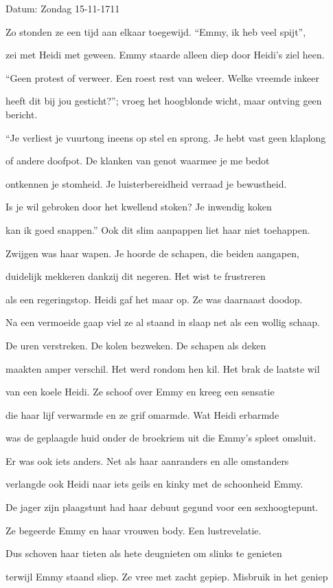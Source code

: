Datum: Zondag 15-11-1711

Zo stonden ze een tijd
aan elkaar toegewijd.
“Emmy, ik heb veel spijt”,

zei met Heidi met geween.
Emmy staarde alleen
diep door Heidi’s ziel heen.

“Geen protest of verweer.
Een roest rest van weleer.
Welke vreemde inkeer

heeft dit bij jou gesticht?”;
vroeg het hoogblonde wicht,
maar ontving geen bericht.

“Je verliest je vuurtong
ineens op stel en sprong.
Je hebt vast geen klaplong

of andere doofpot.
De klanken van genot
waarmee je me bedot

ontkennen je stomheid.
Je luisterbereidheid
verraad je bewustheid.

Is je wil gebroken
door het kwellend stoken?
Je inwendig koken

kan ik goed snappen.”
Ook dit slim aanpappen
liet haar niet toehappen.

Zwijgen was haar wapen.
Je hoorde de schapen,
die beiden aangapen,

duidelijk mekkeren
dankzij dit negeren.
Het wist te frustreren

als een regeringstop.
Heidi gaf het maar op.
Ze was daarnaast doodop.

Na een vermoeide gaap
viel ze al staand in slaap
net als een wollig schaap.

De uren verstreken.
De kolen bezweken.
De schapen als deken

maakten amper verschil.
Het werd rondom hen kil.
Het brak de laatste wil

van een koele Heidi.
Ze schoof over Emmy
en kreeg een sensatie

die haar lijf verwarmde
en ze grif omarmde.
Wat Heidi erbarmde

was de geplaagde huid
onder de broekriem uit
die Emmy’s spleet omsluit.

Er was ook iets anders.
Net als haar aanranders
en alle omstanders

verlangde ook Heidi
naar iets geils en kinky
met de schoonheid Emmy.

De jager zijn plaagstunt
had haar debuut gegund
voor een sexhoogtepunt.

Ze begeerde Emmy
en haar vrouwen body.
Een lustrevelatie.

Dus schoven haar tieten
als hete deugnieten
om slinks te genieten

terwijl Emmy staand sliep.
Ze vree met zacht gepiep.
Misbruik in het geniep

